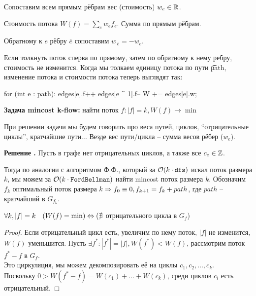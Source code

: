 

Сопоставим всем прямым рёбрам вес (стоимость) $w_e \in \mathbb{R}$.

\begin{Def}
Стоимость потока $W(f) = \sum_e w_ef_e$. Сумма по прямым рёбрам.
\end{Def}

Обратному к $e$ рёбру $\overline{e}$ сопоставим $w_{\,\overline{e}} = {-}w_e$.

\down
Если толкнуть поток сперва по прямому, затем по обратному к нему ребру, стоимость не изменится.
Когда мы толкаем единицу потока по пути \t{path}, изменение 
потока и стоимости потока теперь выглядят так:

\begin{code}
for (int e : path):
	edges[e].f++
	edges[e ^ 1].f--
	W += edges[e].w;
\end{code}

{\bf Задача mincost k-flow:} найти поток $f \colon |f| = k, W(f) \to \min$

\down
При решении задачи мы будем говорить про веса путей, циклов, ``отрицательные циклы'', кратчайшие пути...
Везде вес пути/цикла -- сумма весов рёбер ($w_e$).

\down
{\bf Решение .} Пусть в графе нет отрицательных циклов, а также все $c_e \in \mathbb{Z}$.

Тогда по аналогии с алгоритмом Ф.Ф., который за $\mathcal{O}(k\cdot \texttt{dfs})$ искал поток размера $k$,
мы можем за $\mathcal{O}(k \cdot \texttt{FordBellman})$ найти mincost поток размера $k$.
Обозначим $f_k$ оптимальный поток размера $k \Rightarrow f_0 \equiv 0, f_{k+1} = f_k + path$, где $path$ -- кратчайший в $G_{f_k}$.

\begin{Lm}\label{lm@mincost}
$\forall k, |f| = k \quad (W(f) = \min) \Leftrightarrow (\nexists$ отрицательного цикла в $G_f$)
\end{Lm}
\begin{proof}
Если отрицательный цикл есть, увеличим по нему поток, $|f|$ не изменится, $W(f)$ уменьшится.
Пусть $\exists f^{*} \colon |f^{*}| = |f|, W(f^{*}) < W(f)$, рассмотрим поток $f^{*} - f$ в $G_f$.\\
Это циркуляция, мы можем декомпозировать её на циклы $c_1, c_2, \dots, c_k$. \\
Поскольку $0 > W(f^{*} - f) = W(c_1) + \dots + W(c_k)$,
среди циклов $c_i$ есть отрицательный.
\end{proof}

